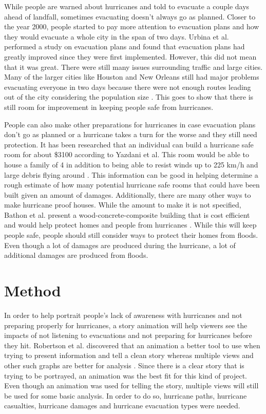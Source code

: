 While people are warned about hurricanes and told to evacuate a couple days ahead of landfall, sometimes evacuating doesn't always go as planned. Closer to the year 2000, people started to pay more attention to evacuation plans and how they would evacuate a whole city in the span of two days. Urbina et al. performed a study on evacuation plans and found that evacuation plans had greatly improved since they were first implemented. However, this did not mean that it was great. There were still many issues surrounding traffic and large cities. Many of the larger cities like Houston and New Orleans still had major problems evacuating everyone in two days because there were not enough routes leading out of the city considering the population size \cite{urbina2003national}. This goes to show that there is still room for improvement in keeping people safe from hurricanes. 

People can also make other preparations for hurricanes in case evacuation plans don't go as planned or a hurricane takes a turn for the worse and they still need protection. It has been researched that an individual can build a hurricane safe room for about \$3100 according to Yazdani et al. This room would be able to house a family of 4 in addition to being able to resist winds up to 225 km/h and large debris flying around \cite{yazdani2005hurricane}. This information can be good in helping determine  a rough estimate of how many potential hurricane safe rooms that could have been built given an amount of damages. Additionally, there are many other ways to make hurricane proof houses. While the amount to make it is not specified, Bathon et al. present a wood-concrete-composite building that is cost efficient and would help protect homes and people from hurricanes \cite{bathon2006hurricane}. While this will keep people safe, people should still consider ways to protect their homes from floods. Even though a lot of damages are produced during the hurricane, a lot of additional damages are produced from floods.

\section{Method}

In order to help portrait people's lack of awareness with hurricanes and not preparing properly for hurricanes, a story animation will help viewers see the impacts of not listening to evacuations and not preparing for hurricanes before they hit. Robertson et al. discovered that an animation a better tool to use when trying to present information and tell a clean story whereas multiple views and other such graphs are better for analysis \cite{robertson2008effectiveness}. Since there is a clear story that is trying to be portrayed, an animation was the best fit for this kind of project. Even though an animation was used for telling the story, multiple views will still be used for some basic analysis. In order to do so, hurricane paths, hurricane casualties, hurricane damages and hurricane evacuation types were needed. 

